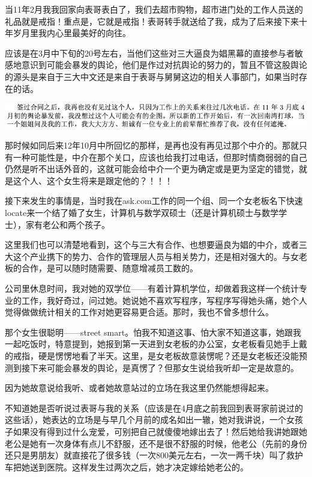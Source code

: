\documentclass[9pt, b5paper]{article}
\begin{document}
当11年2月我我回家向表哥表白了，我们去超市购物，超市进门处的工作人员送的礼品就是戒指！重点是，它就是戒指！表哥转手就送给了我，成为了后来接下来十年岁月里我内心里最美好的向往。

应该是在3月中下旬的20号左右，当他们这些对三大逼良为娼黑幕的直接参与者敏感地意识到可能会暴发的舆论，他们是作过对抗舆论的努力的，暂且不管这股舆论的源头是来自于三大中文还是来自于表哥与舅舅这边的相关人事部门，如果当时存在的话。

\begin{center}
\includegraphics[width=.9\linewidth]{./pic/readme_20210414_200125.png}
\end{center}

那时候如同后来12年10月中所回忆的那样，是再也没有再见过那个中介的。那就只有一种可能性是，中介在那个关口，应该也给我打过电话，但那时情商弱弱的自己仍然是听不出话外音的，这就可能会给中介一个更为确定或是更为坚定的错觉，就是这个人、这个女生将来是跟定他的？！！！

接下来发生的事情是，当时我在ask.com工作的同一个组、同一个女老板名下快速locate来一个结了婚了女生，计算机与数学双硕士（还是计算机硕士与数学学士），家有老公和两个孩子。

这里我们也可以清楚地看到，这个与三大有合作、也想要逼良为娼的中介，或者三大这个产业携下的势力、合作的管理层人员与相关势力，还是相对强大的。与女老板的合作，是可以随时随需要、随意增减员工数的。 

公司里休息时间，我对她的双学位——有着计算机学位，却做着我这样一个统计专业的工作，我好奇过，问过她。她说她不喜欢写程序，写程序写得她头痛，她个人觉得做做统计相关的工作对她更容易更合适。那时，我也不曾多想什么。 

那个女生很聪明——street smart。怕我不知道这事、怕大家不知道这事，她跟我一起吃饭时，特意提到，她报到第一天进到女老板的办公室，女老板看见她手上戴的戒指，硬是愣愣地看了半天。这里，是女老板故意装愣呢？还是女老板还没能预测到接下来可能会暴发的舆论，是真愣了？但那女生说给我听却一定是故意的。

因为她故意说给我听、或者她故意站过的立场在我这里仍然能想得起来。 

不知道她是否听说过表哥与我的关系（应该是在4月底之前我回到表哥家前说过的这些话），她表达的立场是与早几个月前的成名如出一辙，她对我讲说，一个女孩子如果没有得到过什么宠爱，可别把自己就傻傻地嫁出去了！然后她给我讲她跟她老公是她有一次身体有点儿不舒服，还不是很不舒服的时候，他老公（先前的身份还只是男朋友）就直接花了很多钱（一次800美元左右，一次一两千块）叫了救护车把她送到医院。这样发生过两次之后，她才决定嫁给她老公的。 
\end{document}
